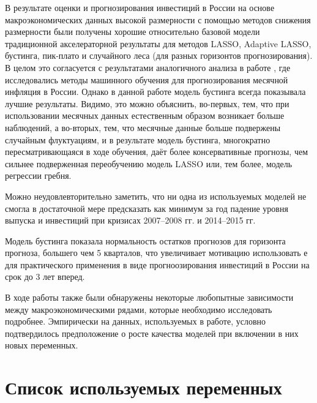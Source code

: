 В результате оценки и прогнозирования инвестиций в России на основе макроэкономических данных высокой размерности с помощью методов снижения размерности были получены хорошие относительно базовой модели традиционной акселераторной результаты для методов LASSO, Adaptive LASSO, бустинга, пик-плато и случайного леса (для разных горизонтов прогнозирования). В целом это согласуется с результатами аналогичного анализа в работе \cite{baybuza2018inflation}, где исследовались методы машинного обучения для прогнозирования месячной инфляция в России. Однако в данной работе модель бустинга всегда показывала лучшие результаты. Видимо, это можно объяснить, во-первых, тем, что при использовании месячных данных естественным образом возникает больше наблюдений, а во-вторых, тем, что месячные данные больше подвержены случайным флуктуациям, и в результате модель бустинга, многократно пересматривающаяся в ходе обучения, даёт более консервативные прогнозы, чем сильнее подверженная переобучению модель LASSO или, тем более, модель регрессии гребня.

Можно неудовлевторительно заметить, что ни одна из используемых моделей не смогла в достаточной мере предсказать как минимум за год падение уровня выпуска и инвестиций при кризисах 2007--2008 гг. и 2014--2015 гг.

Модель бустинга показала нормальность остатков прогнозов для горизонта прогноза, большего чем 5 кварталов, что увеличивает мотивацию использовать е для практического применения в виде прогноозирования инвестиций в России на срок до 3 лет вперед. 

В ходе работы также были обнаружены некоторые любопытные зависимости между макроэкономическими рядами, которые необходимо исследовать подробнее. 
Эмпирически на данных, используемых в работе, условно подтвердилось предположение о росте качества моделей при включении в них новых переменных.

\newpage
\label{ch:final}


\printbibliography

\newpage

\newcommand{\nocontentsline}[3]{}
\newcommand{\tocless}[2]{\bgroup\let\addcontentsline=\nocontentsline#1{#2}\egroup}

\setcounter{chapter}{0}


\renewcommand{\thechapter}{Приложение \Asbuk{chapter}}

\tocless\chapter{Список используемых переменных }

